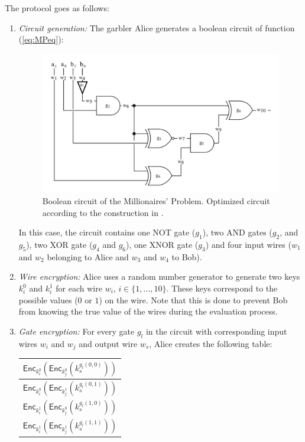 The protocol goes as follows:
\begin{enumerate}
    \item \textit{Circuit generation:} The garbler Alice generates a boolean circuit of function (\ref{eq:MPeq}):
    
    \begin{figure}[h]
        \centering
        \includegraphics[scale=0.3]{Chapter_TechnicalOverview/booleanCircuit.png}

        \caption{Boolean circuit of the Millionaires' Problem. Optimized circuit according to the construction in \cite{Kolesnikov2009}.}
        \label{fig:boolean}
    \end{figure}
    
    In this case, the circuit contains one NOT gate ($g_1$), two AND gates ($g_2$, and $g_5$), two XOR gate ($g_4$ and $g_6$), one XNOR gate ($g_3$) and four input wires ($w_1$ and $w_2$ belonging to Alice and $w_3$ and $w_4$ to Bob).
    
    \item \textit{Wire encryption:} Alice uses a random number generator to generate two keys $k^0_i$ and $k^1_i$ for each wire $w_i$, $i\in\{1, ..., 10\}$. These keys correspond to the possible values ($0$ or $1$) on the wire. Note that this is done to prevent Bob from knowing the true value of the wires during the evaluation process.
    
    \item \textit{Gate encryption:} For every gate $g_l$ in the circuit with corresponding input wires $w_i$ and $w_j$ and output wire $w_s$, Alice creates the following table:

    \begin{center}
        \begin{tabular}{ |c| } 
        \hline
        $\mathsf{Enc}_{k_i^0}\left(\mathsf{Enc}_{k_j^0}\left(k_s^{g_l(0,0)}\right)\right)$ \\ 
        \hline
        $\mathsf{Enc}_{k_i^0}\left(\mathsf{Enc}_{k_j^1}\left(k_s^{g_l(0,1)}\right)\right)$ \\ 
        \hline
        $\mathsf{Enc}_{k_i^1}\left(\mathsf{Enc}_{k_j^0}\left(k_s^{g_l(1,0)}\right)\right)$ \\ 
        \hline
        $\mathsf{Enc}_{k_i^1}\left(\mathsf{Enc}_{k_j^1}\left(k_s^{g_l(1,1)}\right)\right)$ \\
        \hline
        \end{tabular}
    \end{center}
    

\end{enumerate}
